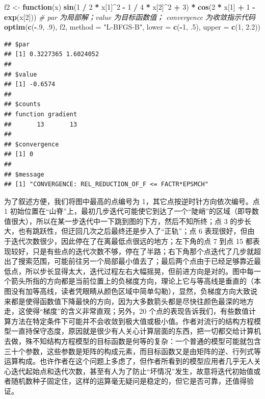 \documentclass[
  b5paper,
  UTF8,twoside]{book}
\newenvironment{Shaded}{\begin{snugshade}}{\end{snugshade}}
\newcommand{\AttributeTok}[1]{\textcolor[rgb]{0.13,0.29,0.53}{#1}}
\newcommand{\CommentTok}[1]{\textcolor[rgb]{0.56,0.35,0.01}{\textit{#1}}}
\newcommand{\ControlFlowTok}[1]{\textcolor[rgb]{0.13,0.29,0.53}{\textbf{#1}}}
\newcommand{\DecValTok}[1]{\textcolor[rgb]{0.00,0.00,0.81}{#1}}
\newcommand{\FloatTok}[1]{\textcolor[rgb]{0.00,0.00,0.81}{#1}}
\newcommand{\FunctionTok}[1]{\textcolor[rgb]{0.13,0.29,0.53}{\textbf{#1}}}
\newcommand{\NormalTok}[1]{#1}
\newcommand{\OtherTok}[1]{\textcolor[rgb]{0.56,0.35,0.01}{#1}}
\newcommand{\SpecialCharTok}[1]{\textcolor[rgb]{0.81,0.36,0.00}{\textbf{#1}}}
\newcommand{\StringTok}[1]{\textcolor[rgb]{0.31,0.60,0.02}{#1}}
\begin{document}
\begin{Shaded}
\begin{Highlighting}[]
\NormalTok{f2 }\OtherTok{\textless{}{-}} \ControlFlowTok{function}\NormalTok{(x) }\FunctionTok{sin}\NormalTok{(}\DecValTok{1} \SpecialCharTok{/} \DecValTok{2} \SpecialCharTok{*}\NormalTok{ x[}\DecValTok{1}\NormalTok{]}\SpecialCharTok{\^{}}\DecValTok{2} \SpecialCharTok{{-}} \DecValTok{1} \SpecialCharTok{/} \DecValTok{4} \SpecialCharTok{*}\NormalTok{ x[}\DecValTok{2}\NormalTok{]}\SpecialCharTok{\^{}}\DecValTok{2} \SpecialCharTok{+} \DecValTok{3}\NormalTok{) }\SpecialCharTok{*}
    \FunctionTok{cos}\NormalTok{(}\DecValTok{2} \SpecialCharTok{*}\NormalTok{ x[}\DecValTok{1}\NormalTok{] }\SpecialCharTok{+} \DecValTok{1} \SpecialCharTok{{-}} \FunctionTok{exp}\NormalTok{(x[}\DecValTok{2}\NormalTok{]))}
\CommentTok{\# par 为局部解；value 为目标函数值； convergence 为收敛指示代码}
\FunctionTok{optim}\NormalTok{(}\FunctionTok{c}\NormalTok{(}\SpecialCharTok{{-}}\NormalTok{.}\DecValTok{9}\NormalTok{, .}\DecValTok{9}\NormalTok{), f2, }\AttributeTok{method =} \StringTok{"L{-}BFGS{-}B"}\NormalTok{, }\AttributeTok{lower =} \FunctionTok{c}\NormalTok{(}\SpecialCharTok{{-}}\DecValTok{1}\NormalTok{, .}\DecValTok{5}\NormalTok{), }\AttributeTok{upper =} \FunctionTok{c}\NormalTok{(}\DecValTok{1}\NormalTok{, }\FloatTok{2.2}\NormalTok{))}
\end{Highlighting}
\end{Shaded}

\begin{verbatim}
## $par
## [1] 0.3227365 1.6024052
## 
## $value
## [1] -0.6574
## 
## $counts
## function gradient 
##       13       13 
## 
## $convergence
## [1] 0
## 
## $message
## [1] "CONVERGENCE: REL_REDUCTION_OF_F <= FACTR*EPSMCH"
\end{verbatim}

为了叙述方便，我们将图中最高的点编号为 1，其它点按逆时针方向依次编号。点 1 初始位置在``山脊''上，最初几步迭代可能使它到达了一个``陡峭''的区域（即导数值很大），所以在某一步迭代中一下跳到图的下方，然后不知所终；点 3 的步长大，也有跳跃性，但迂回几次之后最终还是步入了``正轨''；点 6 表现很好，但由于迭代次数很少，因此停在了在离最低点很远的地方；左下角的点 7 到点 15 都表现较好，只是有些点的迭代次数不够，停在了半路；右下角那个点迭代了几步就超出了搜索范围，可能前往另一个局部最小值去了；最后两个点由于已经足够靠近最低点，所以步长显得太大，迭代过程左右大幅摇晃，但前进方向是对的。图中每一个箭头所指的方向都是当前位置上的负梯度方向，理论上它与等高线是垂直的（本图没有加等高线，读者凭眼睛从颜色区域中简单勾勒），显然，负梯度方向大致说来都是使得函数值下降最快的方向，因为大多数箭头都是尽快往颜色最深的地方走，这使得``梯度''的含义非常直观；另外，20 个点的表现告诉我们，有些数值计算方法在特定条件下可能并不会收敛到极大值或极小值。作者对流行的结构方程模型一直持保守态度，原因就是很少有人关心计算层面的东西，把一切都交给计算机去做，殊不知结构方程模型的目标函数是何等的复杂：一个普通的模型可能就包含三十个参数，这些参数是矩阵的构成元素，而目标函数又是由矩阵的逆、行列式等运算构成。也许作者在这个问题上多虑了，但作者所看到的模型应用者几乎无人关心迭代起始点和迭代次数，甚至有人为了防止``坏情况''发生，故意将迭代初始值或者随机数种子固定住，这样的运算毫无疑问是稳定的，但它是否可靠，还值得验证。
\end{document}
